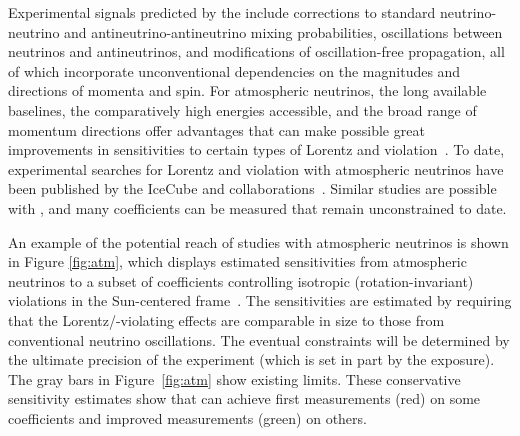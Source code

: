 Experimental signals predicted by the  include
corrections to standard neutrino-neutrino 
and antineutrino-antineutrino mixing probabilities,
oscillations between neutrinos and antineutrinos,
and modifications of oscillation-free propagation,
all of which incorporate unconventional dependencies
on the magnitudes and directions of momenta and spin.
For  atmospheric neutrinos,
the long available baselines,
the comparatively high energies accessible,
and the broad range of momentum directions
offer advantages that can make possible great
improvements 
in sensitivities to certain types of Lorentz and  violation~\cite{Kostelecky:2003cr,Kostelecky:2011gq,Kostelecky:2003xn,Kostelecky:2004hg,Diaz:2009qk,Diaz:2013saa,Diaz:2013wia}.
To date,
experimental searches for Lorentz and  violation
with atmospheric neutrinos have been published 
by the IceCube and \superk collaborations~\cite{Abbasi:2010kx,Abe:2014wla,Aartsen:2017ibm}.
Similar studies are possible with ,
and many  coefficients can be measured that remain unconstrained to date.

An example of the potential reach of studies with  atmospheric neutrinos
is shown in Figure \ref{fig:atm},
which displays estimated sensitivities
from  atmospheric neutrinos to a subset of coefficients 
controlling isotropic (rotation-invariant) violations 
in the Sun-centered frame~\cite{Kostelecky:2002hh}.
The sensitivities are estimated by requiring that the
Lorentz/-violating effects are comparable in size to
those from conventional neutrino oscillations. 
The eventual  constraints will be determined by the
ultimate precision of the experiment (which is set in
part by the exposure).  The gray bars in Figure~\ref{fig:atm} show existing limits.  These conservative sensitivity estimates show that  can achieve first measurements (red) on some coefficients
and improved measurements (green) on others.


